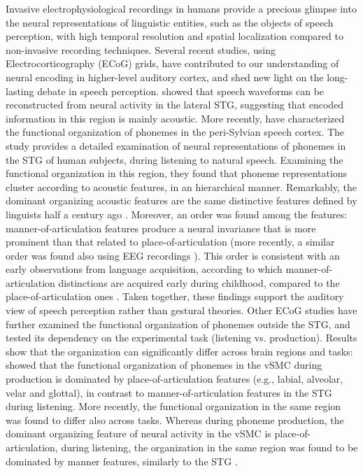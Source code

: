 Invasive electrophysiological recordings in humans provide a precious glimpse into the neural representations of linguistic entities, such as the objects of speech perception, with high temporal resolution and spatial localization compared to non-invasive recording techniques. Several recent studies, using Electrocorticography (ECoG) grids, have contributed to our understanding of neural encoding in higher-level auditory cortex, and shed new light on the long-lasting debate in speech perception. \citet{pasley2012reconstructing} showed that speech waveforms can be reconstructed from neural activity in the lateral STG, suggesting that encoded information in this region is mainly acoustic. More recently, \citet{Mesgarani2014} have characterized the functional organization of phonemes in the peri-Sylvian speech cortex. The study provides a detailed examination of neural representations of phonemes in the STG of human subjects, during listening to natural speech. Examining the functional organization in this region, they found that phoneme representations cluster according to acoustic features, in an hierarchical manner. Remarkably, the dominant organizing acoustic features are the same distinctive features defined by linguists half a century ago \citep{ChomskyHalle1968}. Moreover, an order was found among the features: manner-of-articulation features produce a neural invariance that is more prominent than that related to place-of-articulation (more recently, a similar order was found also using EEG recordings \citep{khalighinejad2017dynamic}). This order is consistent with an early observations from language acquisition, according to which manner-of-articulation distinctions are acquired early during childhood, compared to the place-of-articulation ones \citep{jakobson1968child, grodzinsky2014neural}. Taken together, these findings support the auditory view of speech perception rather than gestural theories. Other ECoG studies have further examined the functional organization of phonemes outside the STG, and tested its dependency on the experimental task (listening vs. production). Results show that the organization can significantly differ across brain regions and tasks: \citet{bouchard2013functional} showed that the functional organization of phonemes in the vSMC during production is dominated by place-of-articulation features (e.g., labial, alveolar, velar and glottal), in contrast to manner-of-articulation features in the STG during listening. More recently, the functional organization in the same region was found to differ also across tasks. Whereas during phoneme production, the dominant organizing feature of neural activity in the vSMC is place-of-articulation, during listening, the organization in the same region was found to be dominated by manner features, similarly to the STG \citep{cheung2016auditory}.

